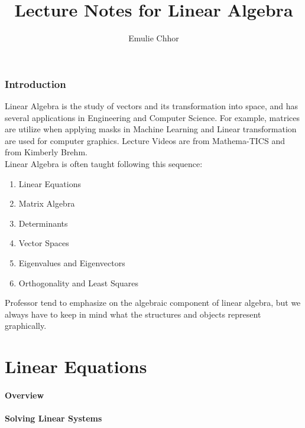 \documentclass{article}
\begin{document}
\title{Lecture Notes for Linear Algebra}
\author{Emulie Chhor}
\maketitle

\section{Introduction}

Linear Algebra is the study of vectors and its transformation into space, and has
several applications in Engineering and Computer Science. For example, matrices
are utilize when applying masks in Machine Learning and Linear transformation are
used for computer graphics. Lecture Videos are from Mathema-TICS and
from Kimberly Brehm.\\

Linear Algebra is often taught following this sequence:

    \begin{enumerate}
	\item Linear Equations
	\item Matrix Algebra
	\item Determinants
	\item Vector Spaces
	\item Eigenvalues and Eigenvectors
	\item Orthogonality and Least Squares
    \end{enumerate}

Professor tend to emphasize on the algebraic component of linear algebra, but we
always have to keep in mind what the structures and objects represent graphically.

\newtheorem{definition}{Definition}[subsection]
\newtheorem{theorem}{Theorem}[subsection]
\newtheorem{corollary}{Corollary}[subsection]
\newtheorem{lemma}[theorem]{Lemma}
\newtheorem*{remark}{Remark}

\part{Linear Equations}

\subsection{Overview}

\subsection{Solving Linear Systems}
\end{document}
